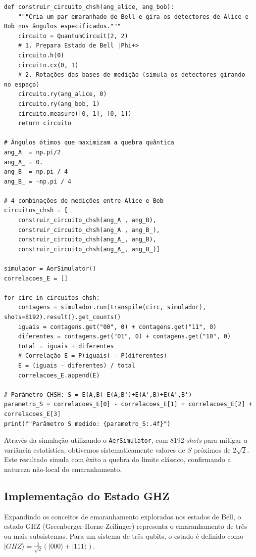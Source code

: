 \documentclass[12pt, a4paper]{article}
\newcommand{\ket}[1]{\lvert #1 \rangle}
\begin{document}
\begin{lstlisting}[caption={Implementação do teste experimental da Desigualdade CHSH simulando a rotação de bases independentes.}]
def construir_circuito_chsh(ang_alice, ang_bob):
    """Cria um par emaranhado de Bell e gira os detectores de Alice e Bob nos ângulos especificados."""
    circuito = QuantumCircuit(2, 2)
    # 1. Prepara Estado de Bell |Phi+>
    circuito.h(0)
    circuito.cx(0, 1)
    # 2. Rotações das bases de medição (simula os detectores girando no espaço)
    circuito.ry(ang_alice, 0)
    circuito.ry(ang_bob, 1)
    circuito.measure([0, 1], [0, 1])
    return circuito

# Ângulos ótimos que maximizam a quebra quântica
ang_A  = np.pi/2
ang_A_ = 0.
ang_B  = np.pi / 4
ang_B_ = -np.pi / 4

# 4 combinações de medições entre Alice e Bob
circuitos_chsh = [
    construir_circuito_chsh(ang_A , ang_B),
    construir_circuito_chsh(ang_A , ang_B_),
    construir_circuito_chsh(ang_A_, ang_B),
    construir_circuito_chsh(ang_A_, ang_B_)]

simulador = AerSimulator()
correlacoes_E = []

for circ in circuitos_chsh:
    contagens = simulador.run(transpile(circ, simulador), shots=8192).result().get_counts()
    iguais = contagens.get("00", 0) + contagens.get("11", 0)
    diferentes = contagens.get("01", 0) + contagens.get("10", 0)
    total = iguais + diferentes
    # Correlação E = P(iguais) - P(diferentes)
    E = (iguais - diferentes) / total
    correlacoes_E.append(E)

# Parâmetro CHSH: S = E(A,B)-E(A,B')+E(A',B)+E(A',B')
parametro_S = correlacoes_E[0] - correlacoes_E[1] + correlacoes_E[2] + correlacoes_E[3]
print(f"Parâmetro S medido: {parametro_S:.4f}")
\end{lstlisting}

Através da simulação utilizando o \texttt{AerSimulator}, com 8192 \textit{shots} para mitigar a variância estatística, obtivemos sistematicamente valores de $S$ próximos de $2\sqrt{2}$. Este resultado simula com êxito a quebra do limite clássico, confirmando a natureza não-local do emaranhamento.

\subsection{Implementação do Estado GHZ}

Expandindo os conceitos de emaranhamento explorados nos estados de Bell, o estado GHZ (Greenberger-Horne-Zeilinger) \cite{greenberger1989going} representa o emaranhamento de três ou mais subsistemas. Para um sistema de três qubits, o estado é definido como $\ket{GHZ} = \frac{1}{\sqrt{2}}(\ket{000} + \ket{111})$.
\end{document}
